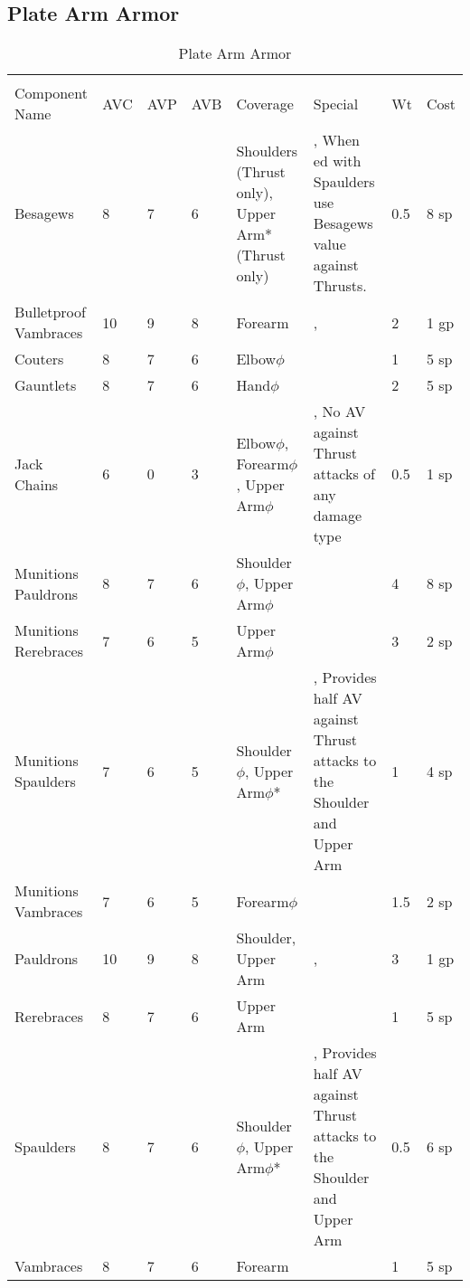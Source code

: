 \documentclass[oneside,11pt,english]{book}
\begin{document}
\subsection{Plate Arm Armor}
\begin{longtabu} to 
	\captionsetup{textformat=empty, labelformat=blank}
	\caption{Plate Arm Armor} \vspace{-15pt}
	\label{tab:Plate Arm Armor}\\
Component Name&AVC&AVP&AVB& Coverage& Special& Wt&Cost\\\toprule
Besagews& 8& 7& 6& Shoulders (Thrust only), Upper Arm* (Thrust only)& , When ed with Spaulders use Besagews value against Thrusts.& 0.5& 8 sp\\
Bulletproof Vambraces& 10& 9& 8& Forearm& , & 2& 1 gp\\
Couters& 8& 7& 6& Elbow\hyperref[sec:Weak Spots]{$\phi$}& & 1& 5 sp\\
Gauntlets& 8& 7& 6& Hand\hyperref[sec:Weak Spots]{$\phi$}& & 2& 5 sp\\
Jack Chains& 6& 0& 3& Elbow\hyperref[sec:Weak Spots]{$\phi$}, Forearm\hyperref[sec:Weak Spots]{$\phi$}, Upper Arm\hyperref[sec:Weak Spots]{$\phi$}& , No AV against Thrust attacks of any damage type& 0.5& 1 sp\\
Munitions Pauldrons& 8& 7& 6& Shoulder\hyperref[sec:Weak Spots]{$\phi$}, Upper Arm\hyperref[sec:Weak Spots]{$\phi$}& & 4& 8 sp\\
Munitions Rerebraces& 7& 6& 5& Upper Arm\hyperref[sec:Weak Spots]{$\phi$}& & 3& 2 sp\\
Munitions Spaulders& 7& 6& 5& Shoulder\hyperref[sec:Weak Spots]{$\phi$}, Upper Arm\hyperref[sec:Weak Spots]{$\phi$}*& , Provides half AV against Thrust attacks to the Shoulder and Upper Arm& 1& 4 sp\\
Munitions Vambraces& 7& 6& 5& Forearm\hyperref[sec:Weak Spots]{$\phi$}& & 1.5& 2 sp\\
Pauldrons& 10& 9& 8& Shoulder, Upper Arm& , & 3& 1 gp\\
Rerebraces& 8& 7& 6& Upper Arm& & 1& 5 sp\\
Spaulders& 8& 7& 6& Shoulder\hyperref[sec:Weak Spots]{$\phi$}, Upper Arm\hyperref[sec:Weak Spots]{$\phi$}*& , Provides half AV against Thrust attacks to the Shoulder 
and Upper Arm& 0.5& 6 sp\\
Vambraces& 8& 7& 6& Forearm& & 1& 5 sp\\
\end{longtabu}
\end{document}
